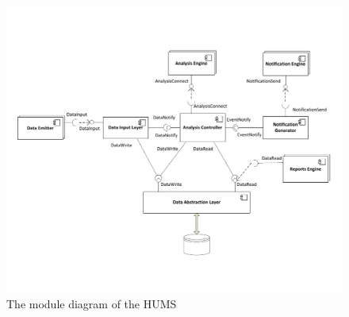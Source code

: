\documentclass[10pt,a4paper]{article}
\begin{document}
\begin{figure}[ht!]
\includegraphics[width=13cm]{images/moduleDiagram.pdf}
\caption{The module diagram of the HUMS}
\label{fig:moduleDiagram}
\end{figure}
\end{document}
